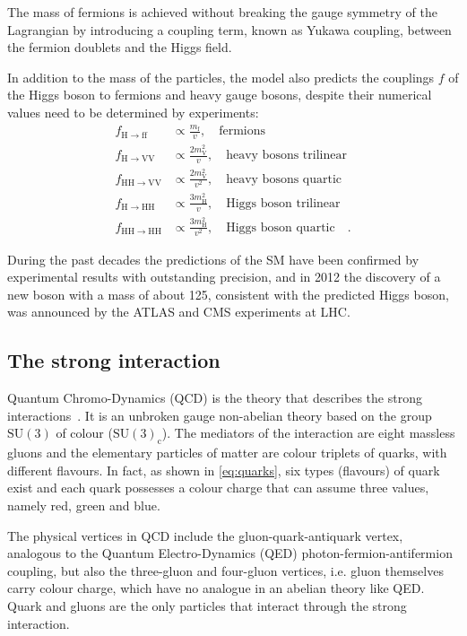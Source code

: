 The mass of fermions is achieved without breaking the gauge symmetry of the Lagrangian by introducing a coupling term, known as Yukawa coupling, between the fermion doublets and the Higgs field.

In addition to the mass of the particles, the model also predicts the couplings $f$ of the Higgs boson to fermions and heavy gauge bosons, despite their numerical values need to be determined by experiments:
\begin{equation}
\begin{split}
f_\mathrm{H\to ff} &\propto \frac{m_\mathrm{f}}{v} ,\quad \text{fermions}\\
f_\mathrm{H\to VV} &\propto \frac{2m_\mathrm{V}^2}{v} ,\quad \text{heavy bosons trilinear}\\
f_\mathrm{HH\to VV} &\propto \frac{2m_\mathrm{V}^2}{v^2} ,\quad \text{heavy bosons quartic}\\
f_\mathrm{H\to HH} &\propto \frac{3m_\mathrm{H}^2}{v} ,\quad \text{Higgs boson trilinear}\\
f_\mathrm{HH\to HH} &\propto \frac{3m_\mathrm{H}^2}{v^2} ,\quad \text{Higgs boson quartic} \quad .
\end{split}
\end{equation}

During the past decades the predictions of the SM have been confirmed by experimental results with outstanding precision, and in 2012 the discovery of a new boson with a mass of about 125\GeV, consistent with the predicted Higgs boson, was announced by the ATLAS and CMS experiments at LHC.


\subsection{The strong interaction}

Quantum Chromo-Dynamics (QCD) is the theory that describes the strong interactions~\cite{Ellis:1991qj}. It is an unbroken gauge non-abelian theory based on the group $\mathrm{SU(3)}$ of colour ($\mathrm{SU(3)_c}$). The mediators of the interaction are eight massless gluons and the elementary particles of matter are colour triplets of quarks, with different flavours. In fact, as shown in \eqref{eq:quarks}, six types (flavours) of quark exist and each quark possesses a colour charge that can assume three values, namely red, green and blue.

The physical vertices in QCD include the gluon-quark-antiquark vertex, analogous to the Quantum Electro-Dynamics (QED) photon-fermion-antifermion coupling, but also the three-gluon and four-gluon vertices, i.e. gluon themselves carry colour charge, which have no analogue in an abelian theory like QED. Quark and gluons are the only particles that interact through the strong interaction.

